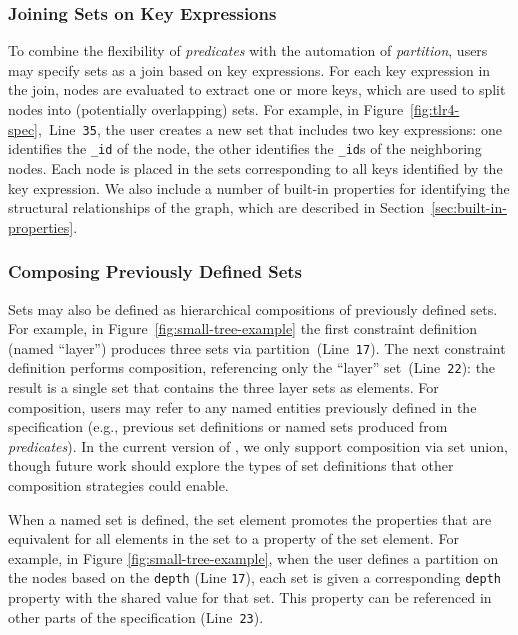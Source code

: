 \subsubsection{Joining Sets on Key Expressions}
To combine the flexibility of \emph{predicates} with the automation of 
\emph{partition}, users may specify sets as a join based on key expressions.
For each key expression in the join, nodes are evaluated to extract one 
or more keys, which are used to split nodes into (potentially overlapping) 
sets. For example, in Figure~\ref{fig:tlr4-spec},~Line~\texttt{35}, the 
user creates a new set that includes two key expressions: one identifies
the \texttt{\_id} of the node, the other identifies the \texttt{\_id}s of
the neighboring nodes. Each node is placed in the sets corresponding to
all keys identified by the key expression. We also include a number of 
built-in properties for identifying the structural relationships of the 
graph, which are described in Section~\ref{sec:built-in-properties}.

\subsubsection{Composing Previously Defined Sets}
Sets may also be defined as hierarchical
compositions of previously defined sets. For example, in
Figure~\ref{fig:small-tree-example} the first constraint definition
(named ``layer'') produces three sets via
partition~(Line~\texttt{17}). The next constraint definition performs 
composition, referencing only the ``layer'' set~(Line~\texttt{22}): the result
is a single set that contains the three layer sets as elements.
For composition, users may
refer to any named entities previously defined in the specification (e.g.,
previous set definitions or named sets produced from \emph{predicates}).
In the current version of \projectname, we only support composition via
set union, though future work should explore the types of set definitions
that other composition strategies could enable.

When a named set is defined, the set element promotes the properties that
are equivalent for all elements in the set to a property of the set
element. For example, in Figure \ref{fig:small-tree-example}, when the user
defines a partition on the nodes based on the \texttt{depth} (Line
\texttt{17}), each set is given a corresponding \texttt{depth} property with
the shared value for that set. This property can be referenced in other 
parts of the \projectname specification (Line~\texttt{23}).

